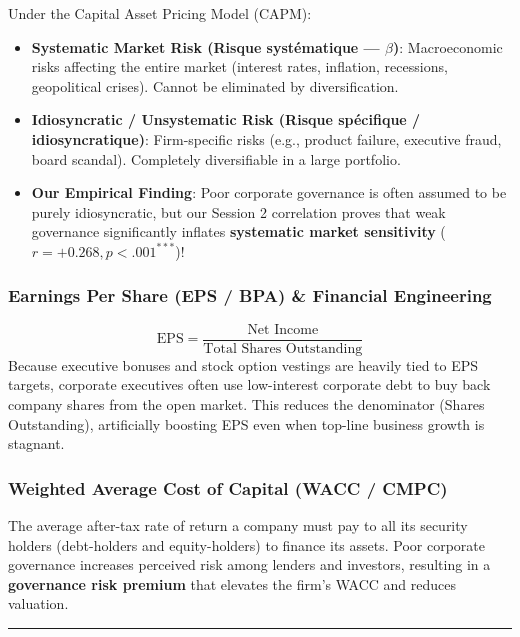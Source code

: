 \documentclass[
]{article}
\providecommand{\tightlist}{%
  \setlength{\itemsep}{0pt}\setlength{\parskip}{0pt}}
\begin{document}
Under the Capital Asset Pricing Model (CAPM):

\begin{itemize}
\tightlist
\item
  \textbf{Systematic Market Risk (Risque systématique --- \(\beta\))}:
  Macroeconomic risks affecting the entire market (interest rates,
  inflation, recessions, geopolitical crises). Cannot be eliminated by
  diversification.
\item
  \textbf{Idiosyncratic / Unsystematic Risk (Risque spécifique /
  idiosyncratique)}: Firm-specific risks (e.g., product failure,
  executive fraud, board scandal). Completely diversifiable in a large
  portfolio.
\item
  \textbf{Our Empirical Finding}: Poor corporate governance is often
  assumed to be purely idiosyncratic, but our Session 2 correlation
  proves that weak governance significantly inflates \textbf{systematic
  market sensitivity} (\(r = +0.268, p < .001^{***}\))!
\end{itemize}

\subsubsection{Earnings Per Share (EPS / BPA) \& Financial
Engineering}\label{earnings-per-share-eps-bpa-financial-engineering}

\[\text{EPS} = \frac{\text{Net Income}}{\text{Total Shares Outstanding}}\]
Because executive bonuses and stock option vestings are heavily tied to
EPS targets, corporate executives often use low-interest corporate debt
to buy back company shares from the open market. This reduces the
denominator (Shares Outstanding), artificially boosting EPS even when
top-line business growth is stagnant.

\subsubsection{Weighted Average Cost of Capital (WACC /
CMPC)}\label{weighted-average-cost-of-capital-wacc-cmpc}

The average after-tax rate of return a company must pay to all its
security holders (debt-holders and equity-holders) to finance its
assets. Poor corporate governance increases perceived risk among lenders
and investors, resulting in a \textbf{governance risk premium} that
elevates the firm's WACC and reduces valuation.

\begin{center}\rule{0.5\linewidth}{0.5pt}\end{center}
\end{document}
